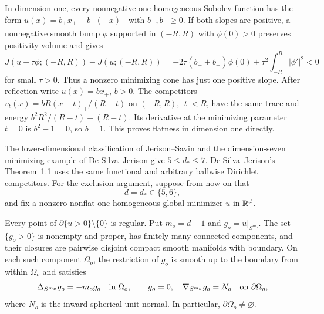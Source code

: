 In dimension one, every nonnegative one-homogeneous Sobolev function
has the form $u(x)=b_+x_++b_-(-x)_+$ with $b_+,b_-\ge0$.
If both slopes are positive, a nonnegative smooth bump $\phi$ supported
in $(-R,R)$ with $\phi(0)>0$ preserves positivity volume and gives
\[
 J(u+\tau\phi;(-R,R))-J(u;(-R,R))
 =-2\tau(b_++b_-)\phi(0)+\tau^2\int_{-R}^R|\phi'|^2<0
\]
for small $\tau>0$. Thus a nonzero minimizing cone has just one positive
slope. After reflection write $u(x)=b x_+$, $b>0$.
The competitors $v_t(x)=bR(x-t)_+/(R-t)$ on $(-R,R)$, $|t|<R$,
have the same trace and energy $b^2R^2/(R-t)+(R-t)$.
Its derivative at the minimizing parameter $t=0$ is $b^2-1=0$,
so $b=1$. This proves flatness in dimension one directly.

The lower-dimensional classification of Jerison--Savin
\cite[Theorem~1.1 and Corollary~1.2]{JerisonSavin2015} and the
dimension-seven minimizing example of De Silva--Jerison
\cite[Theorem~1.1]{DeSilvaJerison2009} give $5\leq d_*\leq7$.
De Silva--Jerison's Theorem~1.1 uses the same functional and arbitrary
ballwise Dirichlet competitors.  For the exclusion argument, suppose from
now on that
\begin{equation}\label{red:first-dimension}
 d=d_*\in\{5,6\},
\end{equation}
and fix a nonzero nonflat one-homogeneous global minimizer $u$ in $\mathbb R^d$.

\begin{proposition}\label{red:original-link}
Every point of $\partial\{u>0\}\setminus\{0\}$ is regular.  Put
$m_o=d-1$ and $g_o=u|_{S^{m_o}}$.  The set $\{g_o>0\}$ is nonempty and
proper, has finitely many connected components, and their closures are
pairwise disjoint compact smooth manifolds with boundary.  On each such
component $\Omega_o$, the restriction of $g_o$ is smooth up to the boundary
from within $\Omega_o$ and satisfies
\begin{equation}\label{red:link-equations}
 \Delta_{S^{m_o}}g_o=-m_o g_o\quad\hbox{in }\Omega_o,
 \qquad g_o=0,\quad \nabla_{S^{m_o}}g_o=N_o
       \quad\hbox{on }\partial\Omega_o,
\end{equation}
where $N_o$ is the inward spherical unit normal.  In particular,
$\partial\Omega_o\ne\varnothing$.
\end{proposition}

